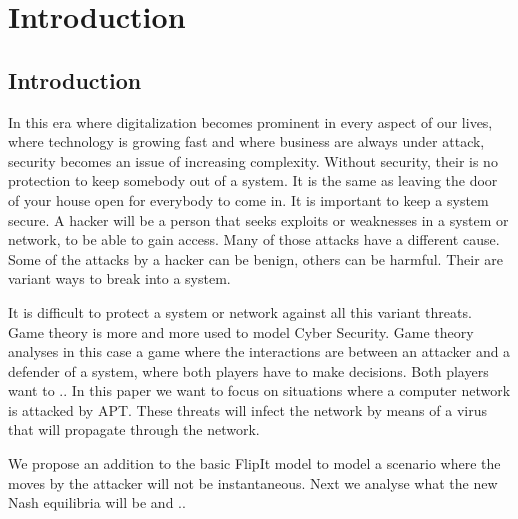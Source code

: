 \chapter{Introduction}
\label{cha:10}
%


\section{Introduction}



In this era where digitalization becomes prominent in every aspect of our lives, where technology is growing fast and where business are always under attack, security becomes an issue of increasing complexity. Without security, their is no protection to keep somebody out of a system. It is the same as leaving the door of your house open for everybody to come in. It is important to keep a system secure.  A hacker will be a person that seeks exploits or weaknesses in a system or network, to be able to gain access.  Many of those attacks have a different cause. Some of the attacks by a hacker can be benign, others can be harmful. Their are variant ways to break into a system. 

It is difficult to protect a system or network against all this variant threats. 
Game theory is more and more used to model Cyber Security. Game theory analyses in this case a game where the interactions are between an attacker and a defender of a system, where both players have to make decisions. Both players want to .. 
In this paper we want to focus on situations where a computer network is attacked by APT. These threats will infect the network by means of a virus that will propagate through the network. 

We propose an addition to the basic FlipIt model to model a scenario where the moves by the attacker will not be instantaneous. Next we analyse what the new Nash equilibria will be and .. 


